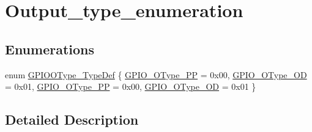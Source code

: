 \hypertarget{group___output__type__enumeration}{\section{Output\-\_\-type\-\_\-enumeration}
\label{group___output__type__enumeration}
}
\subsection*{Enumerations}
\begin{DoxyCompactItemize}
\item 
enum \hyperlink{group___output__type__enumeration_gae74212e8d66c389f47326b06bdf6d2ab}{G\-P\-I\-O\-O\-Type\-\_\-\-Type\-Def} \{ \hyperlink{group___output__type__enumeration_gae74212e8d66c389f47326b06bdf6d2abad967f141221bf702a343f91ad6acf55f}{G\-P\-I\-O\-\_\-\-O\-Type\-\_\-\-P\-P} = 0x00, 
\hyperlink{group___output__type__enumeration_gae74212e8d66c389f47326b06bdf6d2aba1e3717d7271e0707f559a149a1963e43}{G\-P\-I\-O\-\_\-\-O\-Type\-\_\-\-O\-D} = 0x01, 
\hyperlink{group___output__type__enumeration_gae74212e8d66c389f47326b06bdf6d2abad967f141221bf702a343f91ad6acf55f}{G\-P\-I\-O\-\_\-\-O\-Type\-\_\-\-P\-P} = 0x00, 
\hyperlink{group___output__type__enumeration_gae74212e8d66c389f47326b06bdf6d2aba1e3717d7271e0707f559a149a1963e43}{G\-P\-I\-O\-\_\-\-O\-Type\-\_\-\-O\-D} = 0x01
 \}
\end{DoxyCompactItemize}


\subsection{Detailed Description}


